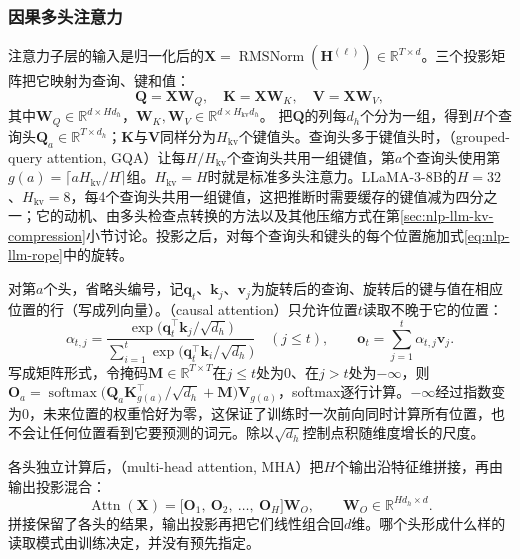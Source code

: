 \subsubsection{因果多头注意力}
\label{sec:nlp-llm-causal-mha}

注意力子层的输入是归一化后的$\bm X=\operatorname{RMSNorm}(\bm H^{(\ell)})\in\mathbb R^{T\times d}$。三个投影矩阵把它映射为查询、键和值：
\[
  \bm Q=\bm X\bm W_Q,\quad \bm K=\bm X\bm W_K,\quad \bm V=\bm X\bm W_V,
\]
其中$\bm W_Q\in\mathbb R^{d\times Hd_h}$，$\bm W_K,\bm W_V\in\mathbb R^{d\times H_{\mathrm{kv}}d_h}$。
把$\bm Q$的列每$d_h$个分为一组，得到$H$个查询头$\bm Q_a\in\mathbb R^{T\times d_h}$；$\bm K$与$\bm V$同样分为$H_{\mathrm{kv}}$个键值头。查询头多于键值头时，（grouped-query attention, GQA）让每$H/H_{\mathrm{kv}}$个查询头共用一组键值，第$a$个查询头使用第$g(a)=\lceil aH_{\mathrm{kv}}/H\rceil$组。$H_{\mathrm{kv}}=H$时就是标准多头注意力。LLaMA-3-8B的$H=32$、$H_{\mathrm{kv}}=8$，每4个查询头共用一组键值，这把推断时需要缓存的键值减为四分之一；它的动机、由多头检查点转换的方法以及其他压缩方式在第\ref{sec:nlp-llm-kv-compression}小节讨论。投影之后，对每个查询头和键头的每个位置施加式\eqref{eq:nlp-llm-rope}中的旋转。

对第$a$个头，省略头编号，记$\bm q_t$、$\bm k_j$、$\bm v_j$为旋转后的查询、旋转后的键与值在相应位置的行（写成列向量）。（causal attention）只允许位置$t$读取不晚于它的位置：
\begin{equation}
  \alpha_{t,j}=\frac{\exp\bigl(\bm q_t^{\top}\bm k_j/\sqrt{d_h}\bigr)}
  {\sum_{i=1}^{t}\exp\bigl(\bm q_t^{\top}\bm k_i/\sqrt{d_h}\bigr)}\quad(j\leq t),
  \qquad
  \bm o_t=\sum_{j=1}^{t}\alpha_{t,j}\bm v_j.
  \label{eq:nlp-llm-causal-attention}
\end{equation}
写成矩阵形式，令掩码$\bm M\in\mathbb R^{T\times T}$在$j\leq t$处为0、在$j>t$处为$-\infty$，则$\bm O_a=\operatorname{softmax}\bigl(\bm Q_a\bm K_{g(a)}^{\top}/\sqrt{d_h}+\bm M\bigr)\bm V_{g(a)}$，softmax逐行计算。$-\infty$经过指数变为0，未来位置的权重恰好为零，这保证了训练时一次前向同时计算所有位置，也不会让任何位置看到它要预测的词元。除以$\sqrt{d_h}$控制点积随维度增长的尺度。

各头独立计算后，（multi-head attention, MHA）把$H$个输出沿特征维拼接，再由输出投影混合：
\begin{equation}
  \operatorname{Attn}(\bm X)=\bigl[\bm O_1,\ \bm O_2,\ \ldots,\ \bm O_H\bigr]\bm W_O,
  \qquad \bm W_O\in\mathbb R^{Hd_h\times d}.
  \label{eq:nlp-llm-mha}
\end{equation}
拼接保留了各头的结果，输出投影再把它们线性组合回$d$维。哪个头形成什么样的读取模式由训练决定，并没有预先指定。

